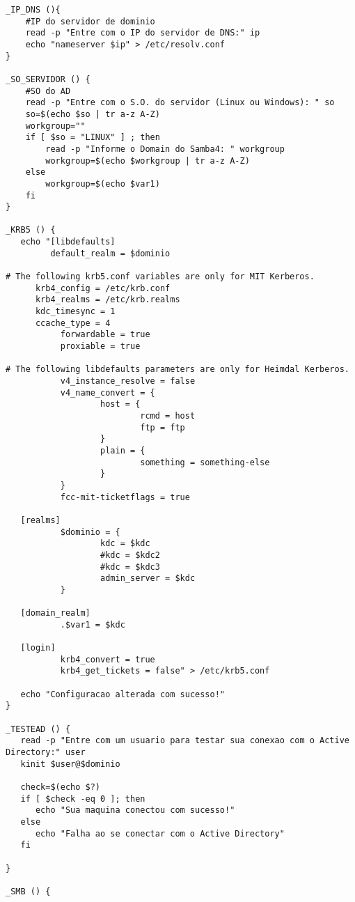 \begin{lstlisting}
_IP_DNS (){
	#IP do servidor de dominio
	read -p "Entre com o IP do servidor de DNS:" ip
	echo "nameserver $ip" > /etc/resolv.conf
}

_SO_SERVIDOR () {
	#SO do AD	
	read -p "Entre com o S.O. do servidor (Linux ou Windows): " so
	so=$(echo $so | tr a-z A-Z)
	workgroup=""
	if [ $so = "LINUX" ] ; then
		read -p "Informe o Domain do Samba4: " workgroup
		workgroup=$(echo $workgroup | tr a-z A-Z)
	else
		workgroup=$(echo $var1)
	fi
}
 
_KRB5 () {
   echo "[libdefaults]
         default_realm = $dominio
 
# The following krb5.conf variables are only for MIT Kerberos.
      krb4_config = /etc/krb.conf
      krb4_realms = /etc/krb.realms
      kdc_timesync = 1
      ccache_type = 4
           forwardable = true
           proxiable = true
 
# The following libdefaults parameters are only for Heimdal Kerberos.
           v4_instance_resolve = false
           v4_name_convert = {
                   host = {
                           rcmd = host
                           ftp = ftp
                   }  
                   plain = {
                           something = something-else
                   }  
           }  
           fcc-mit-ticketflags = true
 
   [realms]
           $dominio = {
                   kdc = $kdc
                   #kdc = $kdc2
                   #kdc = $kdc3
                   admin_server = $kdc
           }  
             
   [domain_realm]
           .$var1 = $kdc
 
   [login]
           krb4_convert = true
           krb4_get_tickets = false" > /etc/krb5.conf
 
   echo "Configuracao alterada com sucesso!"
}
 
_TESTEAD () {
   read -p "Entre com um usuario para testar sua conexao com o Active Directory:" user
   kinit $user@$dominio
    
   check=$(echo $?)
   if [ $check -eq 0 ]; then
      echo "Sua maquina conectou com sucesso!"
   else
      echo "Falha ao se conectar com o Active Directory"
   fi
    
}
 
_SMB () {
    

\end{lstlisting}
